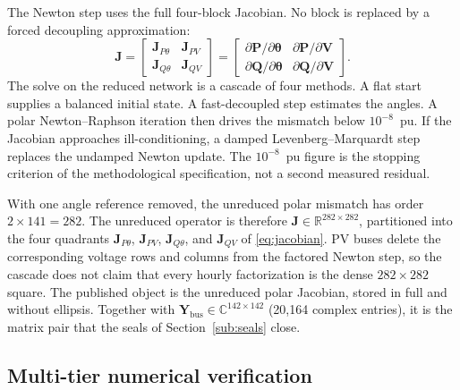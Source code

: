 The Newton step uses the full four-block Jacobian. No block is replaced by a forced decoupling approximation:
\begin{equation}
\mathbf{J} =
\begin{bmatrix}
\mathbf{J}_{P\theta} & \mathbf{J}_{PV} \\
\mathbf{J}_{Q\theta} & \mathbf{J}_{QV}
\end{bmatrix}
=
\begin{bmatrix}
\partial \mathbf{P} / \partial \boldsymbol{\theta} & \partial \mathbf{P} / \partial \mathbf{V} \\[4pt]
\partial \mathbf{Q} / \partial \boldsymbol{\theta} & \partial \mathbf{Q} / \partial \mathbf{V}
\end{bmatrix}.
\label{eq:jacobian}
\end{equation}
The solve on the reduced network is a cascade of four methods. A flat start supplies a balanced initial state. A fast-decoupled step estimates the angles. A polar Newton--Raphson iteration then drives the mismatch below $10^{-8}$~pu. If the Jacobian approaches ill-conditioning, a damped Levenberg--Marquardt step replaces the undamped Newton update. The $10^{-8}$~pu figure is the stopping criterion of the methodological specification, not a second measured residual.


With one angle reference removed, the unreduced polar mismatch has order $2\times 141=282$. The unreduced operator is therefore $\mathbf{J}\in\mathbb{R}^{282\times 282}$, partitioned into the four quadrants $\mathbf{J}_{P\theta}$, $\mathbf{J}_{PV}$, $\mathbf{J}_{Q\theta}$, and $\mathbf{J}_{QV}$ of \eqref{eq:jacobian}. PV buses delete the corresponding voltage rows and columns from the factored Newton step, so the cascade does not claim that every hourly factorization is the dense $282\times 282$ square. The published object is the unreduced polar Jacobian, stored in full and without ellipsis. Together with $\mathbf{Y}_{\mathrm{bus}}\in\mathbb{C}^{142\times 142}$ (20,164 complex entries), it is the matrix pair that the seals of Section~\ref{sub:seals} close.

\subsection{Multi-tier numerical verification}
\label{sub:trinity}

